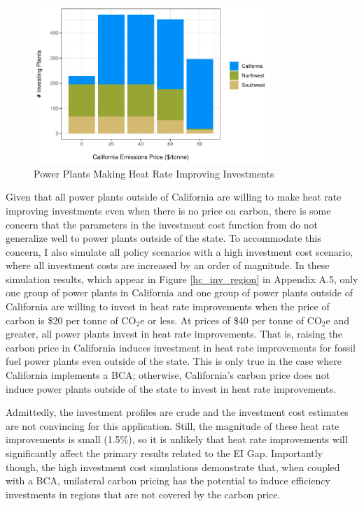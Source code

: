 \begin{figure}
    \centering
    \caption{Power Plants Making Heat Rate Improving Investments \label{inv_region}}
    \includegraphics[width=0.8\textwidth]{figures/chapter5_figures/inv_region.pdf}
\end{figure}

Given that all power plants outside of California are willing to make heat rate improving investments even when there is no price on carbon, there is some concern that the parameters in the investment cost function from \cite{weber2021dynamic} do not generalize well to power plants outside of the state. To accommodate this concern, I also simulate all policy scenarios with a high investment cost scenario, where all investment costs are increased by an order of magnitude. In these simulation results, which appear in Figure \ref{hc_inv_region} in Appendix A.5, only one group of power plants in California and one group of power plants outside of California are willing to invest in heat rate improvements when the price of carbon is \$20 per tonne of CO$_2$e or less. At prices of \$40 per tonne of CO$_2$e and greater, all power plants invest in heat rate improvements. That is, raising the carbon price in California induces investment in heat rate improvements for fossil fuel power plants even outside of the state. This is only true in the case where California implements a BCA; otherwise, California's carbon price does not induce power plants outside of the state to invest in heat rate improvements.

Admittedly, the investment profiles are crude and the investment cost estimates are not convincing for this application. Still, the magnitude of these heat rate improvements is small (1.5\%), so it is unlikely that heat rate improvements will significantly affect the primary results related to the EI Gap. Importantly though, the high investment cost simulations demonstrate that, when coupled with a BCA, unilateral carbon pricing has the potential to induce efficiency investments in regions that are not covered by the carbon price. 

